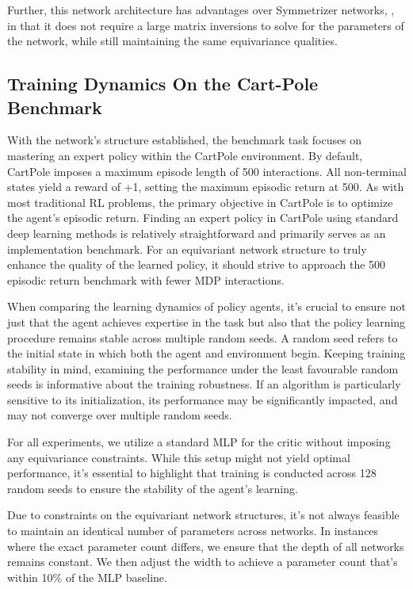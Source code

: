 Further, this network architecture has advantages over Symmetrizer networks, \cite{vanderpol2020mdp}, in that it does not require a large matrix inversions to solve for the parameters of the network, while still maintaining the same equivariance qualities.

\subsection{Training Dynamics On the Cart-Pole Benchmark}
With the network's structure established, the benchmark task focuses on mastering an expert policy within the CartPole environment. By default, CartPole imposes a maximum episode length of 500 interactions. All non-terminal states yield a reward of +1, setting the maximum episodic return at 500. As with most traditional RL problems, the primary objective in CartPole is to optimize the agent's episodic return. Finding an expert policy in CartPole using standard deep learning methods is relatively straightforward and primarily serves as an implementation benchmark. For an equivariant network structure to truly enhance the quality of the learned policy, it should strive to approach the 500 episodic return benchmark with fewer MDP interactions.

When comparing the learning dynamics of policy agents, it's crucial to ensure not just that the agent achieves expertise in the task but also that the policy learning procedure remains stable across multiple random seeds. A random seed refers to the initial state in which both the agent and environment begin. Keeping training stability in mind, examining the performance under the least favourable random seeds is informative about the training robustness. If an algorithm is particularly sensitive to its initialization, its performance may be significantly impacted, and may not converge over multiple random seeds.

For all experiments, we utilize a standard MLP for the critic without imposing any equivariance constraints. While this setup might not yield optimal performance, it's essential to highlight that training is conducted across 128 random seeds to ensure the stability of the agent's learning.

Due to constraints on the equivariant network structures, it's not always feasible to maintain an identical number of parameters across networks. In instances where the exact parameter count differs, we ensure that the depth of all networks remains constant. We then adjust the width to achieve a parameter count that's within 10\% of the MLP baseline.

